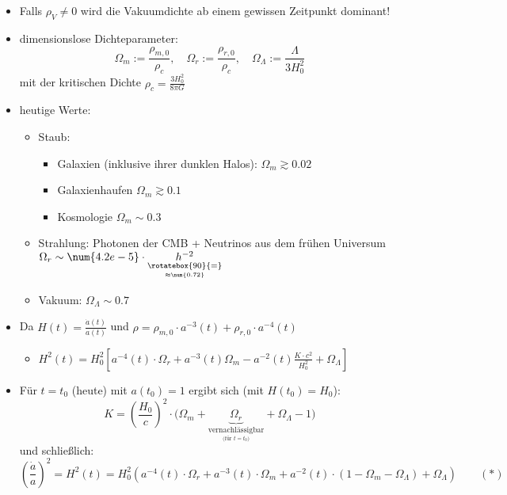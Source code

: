\begin{itemize}
	\item Falls $\rho_V\neq 0$ wird die Vakuumdichte ab einem gewissen Zeitpunkt dominant!
	\item dimensionslose Dichteparameter:
		\begin{equation*}
			\Omega_m :=\frac{\rho_{m,0}}{\rho_c},\quad\Omega_r :=\frac{\rho_{r,0}}{\rho_c},\quad\Omega_\Lambda :=\frac{\Lambda}{3H_0^2}
		\end{equation*}
		mit der kritischen Dichte $\rho_c=\frac{3H_0^2}{8\pi G}$
	\item heutige Werte:
		\begin{itemize}[label={}]
			\item Staub:
				\begin{itemize}[label={}]
					\item Galaxien (inklusive ihrer dunklen Halos): $\Omega_m\gtrsim\num{0.02}$
					\item Galaxienhaufen $\Omega_m\gtrsim\num{0.1}$
					\item Kosmologie $\Omega_m\sim\num{0.3}$
				\end{itemize}
			\item Strahlung: Photonen der CMB + Neutrinos aus dem frühen Universum $\Omega_r\sim\num{4.2e-5}\cdot \underset{\underset{\approx\num{0.72}}{\rotatebox{90}{=}}}{h^{-2}}$
			\item Vakuum: $\Omega_\Lambda\sim\num{0.7}$
		\end{itemize}
	\item Da $H(t)=\frac{\dot{a}(t)}{a(t)}$ und $\rho=\rho_{m,0}\cdot a^{-3}(t)+\rho_{r,0}\cdot a^{-4}(t)$
		\begin{itemize}
			\item $H^2(t)=H_0^2\left[a^{-4}(t)\cdot\Omega_r+a^{-3}(t)\Omega_m-a^{-2}(t)\frac{K\cdot c^2}{H_0^2}+\Omega_\Lambda\right]$
		\end{itemize}
	\item Für $t=t_0$ (heute) mit $a(t_0)=1$ ergibt sich (mit $H(t_0)=H_0$):
		\begin{equation*}
			K=\left(\frac{H_0}{c}\right)^2\cdot\big(\Omega_m+\underset{\underset{\text{(für $t=t_0$)}}{\text{vernachlässigbar}}}{\underbrace{\Omega_r}}+\Omega_\Lambda -1\big)
		\end{equation*}
		und schließlich:
		\begin{equation*}
			\left(\frac{\dot{a}}{a}\right)^2=H^2(t)=H_0^2\left(a^{-4}(t)\cdot\Omega_r+a^{-3}(t)\cdot\Omega_m+a^{-2}(t)\cdot (1-\Omega_m-\Omega_\Lambda)+\Omega_\Lambda\right)\qquad (\ast)
		\end{equation*}
\end{itemize}
